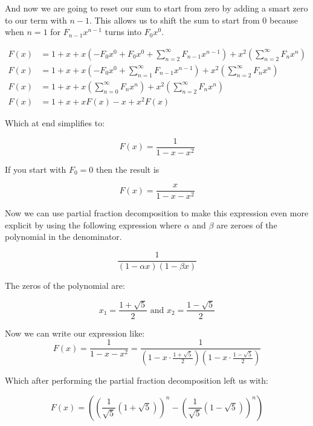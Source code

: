 And now we are going to reset our sum to start from zero by adding a smart zero to our term with 
\(n - 1\). This allows us to shift the sum to start from 0 because when \(n = 1\) for 
\(F_{n - 1}x^{n - 1}\) turns into \(F_0 x^0\).

\begin{align*}
    F(x) &= 1 + x + x \left( -F_{0}x^0 + F_{0}x^0 + \sum_{n = 2}^{\infty} F_{n-1} x^{n-1}\right) + x^2 \left( \sum_{n = 2}^{\infty} F_{n} x^{n}\right)\\
    F(x) &= 1 + x + x \left( -F_{0}x^0 + \sum_{n = 1}^{\infty} F_{n-1} x^{n-1}\right) + x^2 \left( \sum_{n = 2}^{\infty} F_{n} x^{n}\right)\\
    F(x) &= 1 + x + x \left( \sum_{n = 0}^{\infty} F_{n} x^{n}\right) + x^2 \left( \sum_{n = 2}^{\infty} F_{n} x^{n}\right)\\
    F(x) &= 1 + x + x F(x) - x + x^2 F(x)
\end{align*}

Which at end simplifies to:

\[
    F(x) = \frac{1}{1 - x - x^2}
\]

If you start with \(F_0 = 0\) then the result  is

\[
    F(x) = \frac{x}{1 - x - x^2}
\]

Now we can use partial fraction decomposition to make this expression even more explicit
by using the following expression where \(\alpha\) and \(\beta\) are zeroes of the polynomial in the
denominator.

\[
    \frac{1}{\left(1 - \alpha x\right)\left(1 - \beta x\right)}
\]

The zeros of the polynomial are:

\[
    x_1 = \frac{1 + \sqrt{5}}{2} \text{ and }  x_2 = \frac{1 - \sqrt{5}}{2}    
\]

Now we can write our expression like:
\[
    F(x) = \frac{1}{1 - x - x^2} = \frac{1}{\left(1 - x \cdot \frac{1 + \sqrt{5}}{2}\right)\left(1 - x 
    \cdot \frac{1 - \sqrt{5}}{2}\right)}
\]

Which after performing the partial fraction decomposition left us with:

\[
    F(x) = \left( {\left( \frac{1}{\sqrt{5}} (1 + \sqrt{5}) \right)}^n - {\left( \frac{1}{\sqrt{5}} 
    (1 - \sqrt{5}) \right)}^n \right)
\]

\QED

